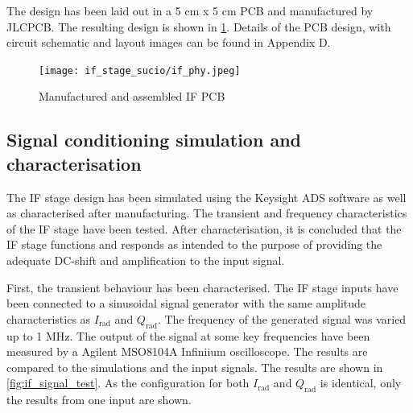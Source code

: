 %
%

The design has been laid out in a 5 cm x 5 cm PCB and manufactured by JLCPCB. The resulting design is shown in \cref{fig:if_phy}. Details of the PCB design, with circuit schematic and layout images can be found in Appendix D. %

\begin{figure}[h]
	\centering
	\texttt{[image: if\_stage\_sucio/if\_phy.jpeg]}
	\caption{Manufactured and assembled IF PCB}
	\label{fig:if_phy}
\end{figure}

\subsection{Signal conditioning simulation and characterisation}

The IF stage design has been simulated using the Keysight ADS software as well as characterised after manufacturing. The transient and frequency characteristics of the IF stage have been tested. After characterisation, it is concluded that the IF stage functions and responds as intended to the purpose of providing the adequate DC-shift and amplification to the input signal.

First, the transient behaviour has been characterised. The IF stage inputs have been connected to a sinusoidal signal generator with the same amplitude characteristics as $I_\mathrm{rad}$ and $Q_\mathrm{rad}$. The frequency of the generated signal was varied up to 1 MHz. The output of the signal at some key frequencies have been measured by a Agilent MSO8104A Infiniium oscilloscope. The results are compared to the simulations and the input signals. The results are shown in \cref{fig:if_signal_test}. As the configuration for both $I_\mathrm{rad}$ and $Q_\mathrm{rad}$ is identical, only the results from one input are shown.

